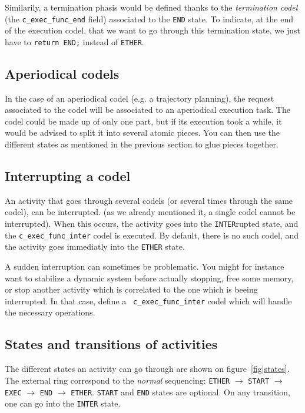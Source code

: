 Similarily, a termination phasis   would be defined   thanks to the  {\em
termination codel} (the {\tt c\_exec\_func\_end} field) associated to the
{\tt END} state. To indicate, at the end of  the execution codel, that we
want to go through this  termination state, we just  have to {\tt  return
END;} instead of {\tt ETHER}.


\subsection{Aperiodical codels}

In  the case of  an aperiodical codel (e.g.   a trajectory planning), the
request associated  to the codel  will be  associated to  an  aperiodical
execution task. The codel  could be made up of  only one part, but if its
execution took  a while,  it  would be advised  to  split it into several
atomic pieces.  You can then use the different states as mentioned in the
previous section to glue pieces together.


\subsection{Interrupting a codel}

An activity that  goes through several  codels (or  several times through
the  same codel), can  be  interrupted.  (as  we already  mentioned it, a
single codel cannot be interrupted). When  this occurs, the activity goes
into the  {\tt INTER}rupted  state,  and the  {\tt  c\_exec\_func\_inter}
codel is executed.  By default, there is  no such codel, and the activity
goes immediatly into the {\tt ETHER} state.

A  sudden  interruption can   sometimes  be problematic.  You  might  for
instance  want  to stabilize a dynamic   system before actually stopping,
free some memory, or stop another activity which is correlated to the one
which   is  beeing     interrupted.  In   that  case,   define    a  {\tt
c\_exec\_func\_inter} codel which will handle the necessary operations.


\subsection{States and transitions of activities}

The   different  states   an  activity can   go   through  are  shown  on
figure~\ref{fig|states}. The external ring correspond to the {\em normal}
sequencing: {\tt  ETHER} $\rightarrow$   {\tt START} $\rightarrow$   {\tt
EXEC} $\rightarrow$ {\tt END}  $\rightarrow$ {\tt ETHER}. {\tt START} and
{\tt END}  states are optional.   On any transition, one  can go into the
{\tt INTER} state.

